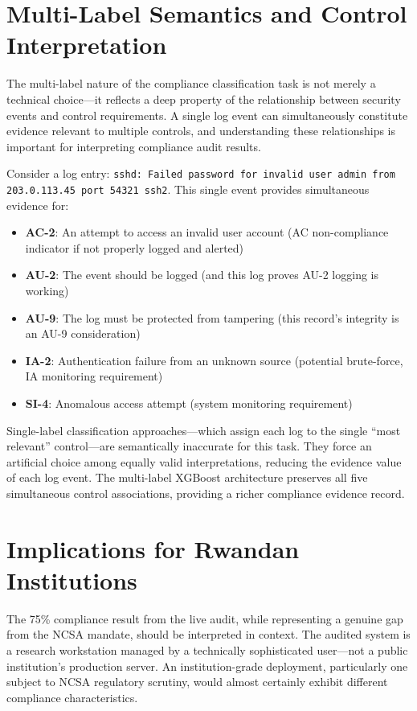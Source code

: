\documentclass[12pt,oneside]{report}
\begin{document}
\section{Multi-Label Semantics and Control Interpretation}

The multi-label nature of the compliance classification task is not merely a technical choice—it reflects a deep property of the relationship between security events and control requirements. A single log event can simultaneously constitute evidence relevant to multiple controls, and understanding these relationships is important for interpreting compliance audit results.

Consider a log entry: \texttt{sshd: Failed password for invalid user admin from 203.0.113.45 port 54321 ssh2}. This single event provides simultaneous evidence for:
\begin{itemize}
  \item \textbf{AC-2}: An attempt to access an invalid user account (AC non-compliance indicator if not properly logged and alerted)
  \item \textbf{AU-2}: The event should be logged (and this log proves AU-2 logging is working)
  \item \textbf{AU-9}: The log must be protected from tampering (this record's integrity is an AU-9 consideration)
  \item \textbf{IA-2}: Authentication failure from an unknown source (potential brute-force, IA monitoring requirement)
  \item \textbf{SI-4}: Anomalous access attempt (system monitoring requirement)
\end{itemize}

Single-label classification approaches—which assign each log to the single ``most relevant'' control—are semantically inaccurate for this task. They force an artificial choice among equally valid interpretations, reducing the evidence value of each log event. The multi-label XGBoost architecture preserves all five simultaneous control associations, providing a richer compliance evidence record.

\section{Implications for Rwandan Institutions}

The 75\% compliance result from the live audit, while representing a genuine gap from the NCSA mandate, should be interpreted in context. The audited system is a research workstation managed by a technically sophisticated user—not a public institution's production server. An institution-grade deployment, particularly one subject to NCSA regulatory scrutiny, would almost certainly exhibit different compliance characteristics.
\end{document}
